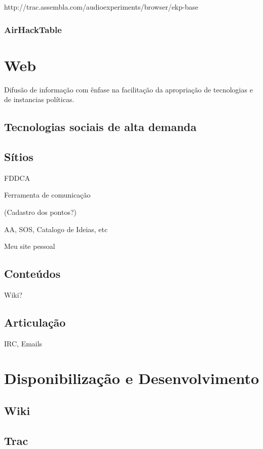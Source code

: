 http://trac.assembla.com/audioexperiments/browser/ekp-base


      \subsubsection{AirHackTable}


\section{Web}

Difusão de informação com ênfase na facilitação
da apropriação de tecnologias e de instancias políticas.

\subsection{Tecnologias sociais de alta demanda}

\subsection{Sítios}

FDDCA

Ferramenta de comunicação

(Cadastro dos pontos?)

AA, SOS, Catalogo de Ideias, etc

Meu site pessoal


\subsection{Conteúdos}

Wiki?

\subsection{Articulação}

IRC, Emails

\section{Disponibilização e Desenvolvimento}

\subsection{Wiki}

\subsection{Trac}

